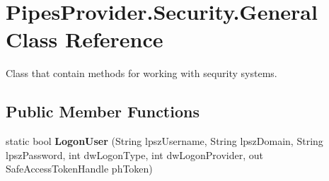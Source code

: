 \hypertarget{class_pipes_provider_1_1_security_1_1_general}{}\section{Pipes\+Provider.\+Security.\+General Class Reference}
\label{class_pipes_provider_1_1_security_1_1_general}


Class that contain methods for working with sequrity systems.  


\subsection*{Public Member Functions}
\begin{DoxyCompactItemize}
\item 
\mbox{\label{class_pipes_provider_1_1_security_1_1_general_afd0b01ce4c3cdf3079e88d54cb6d655e}} 
static bool {\bfseries Logon\+User} (String lpsz\+Username, String lpsz\+Domain, String lpsz\+Password, int dw\+Logon\+Type, int dw\+Logon\+Provider, out Safe\+Access\+Token\+Handle ph\+Token)
\end{DoxyCompactItemize}
